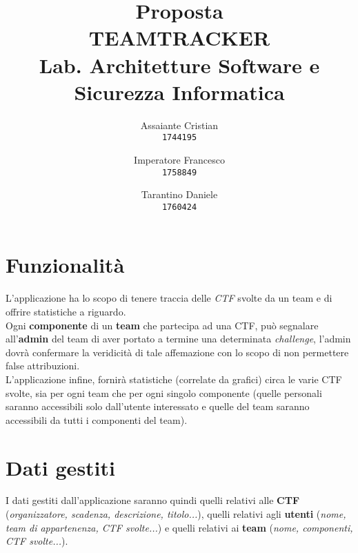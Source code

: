 \documentclass[a4paper,12pt]{extarticle}
\begin{document}
\title{Proposta \\ \huge{\uppercase{Teamtracker}} \\[3mm] \Large{Lab. Architetture Software e Sicurezza Informatica}}
\author{
	Assaiante Cristian\\
	\texttt{1744195}
	\and
	Imperatore Francesco\\
	\texttt{1758849}
	\and
	Tarantino Daniele\\
	\texttt{1760424}
}
\date{}
\maketitle
\thispagestyle{empty}
\newpage
\section{Funzionalità}
L'applicazione ha lo scopo di tenere traccia delle \textit{CTF} svolte da un team e di offrire statistiche a riguardo.\\Ogni \textbf{componente} di un \textbf{team} che partecipa ad una CTF, può segnalare all'\textbf{admin} del team di aver portato a termine una determinata \textit{challenge}, l'admin dovrà confermare la veridicità di tale affemazione con lo scopo di non permettere false attribuzioni.\\L'applicazione infine, fornirà statistiche (correlate da grafici) circa le varie CTF svolte, sia per ogni team che per ogni singolo componente (quelle personali saranno accessibili solo dall'utente interessato e quelle del team saranno accessibili da tutti i componenti del team).
\section{Dati gestiti}
I dati gestiti dall'applicazione saranno quindi quelli relativi alle \textbf{CTF} (\textit{organizzatore, scadenza, descrizione, titolo...}), quelli relativi agli \textbf{utenti} (\textit{nome, team di appartenenza, CTF svolte...}) e quelli relativi ai \textbf{team} (\textit{nome, componenti, CTF svolte...}).
\end{document}
